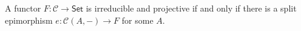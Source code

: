 A functor $F\colon \mathcal{C}\to \mathsf{Set}$ is irreducible and projective
if and only if there is a split epimorphism $e\colon \mathcal{C}(A, {-})\to F$ for
some $A$.
